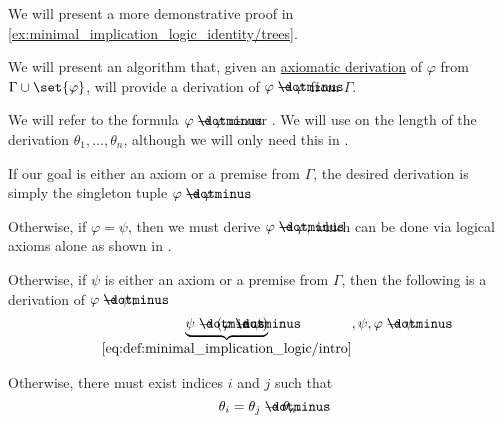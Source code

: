 \begin{comments}
  \item We will present a more demonstrative proof in \eqref{ex:minimal_implication_logic_identity/trees}.
\end{comments}

\begin{algorithm}\label{alg:derivation_conclusion_hypothesis_introduction}
  We will present an algorithm that, given an \hyperref[def:axiomatic_derivation]{axiomatic derivation} of \( \varphi \) from \( \Gamma \cup \set{ \varphi } \), will provide a derivation of \( \varphi \synimplies \varphi \) from \( \Gamma \).

  We will refer to the formula \( \varphi \synimplies \varphi \) as our . We will use  on the length of the derivation \( \theta_1, \ldots, \theta_n \), although we will only need this in .

  \begin{thmenum}
     If our goal is either an axiom or a premise from \( \Gamma \), the desired derivation is simply the singleton tuple \( \varphi \synimplies \varphi \).

     Otherwise, if \( \varphi = \psi \), then we must derive \( \varphi \synimplies \varphi \), which can be done via logical axioms alone as shown in .

     Otherwise, if \( \psi \) is either an axiom or a premise from \( \Gamma \), then the following is a derivation of \( \varphi \synimplies \psi \):
    \begin{equation*}
      \underbrace{\psi \synimplies (\varphi \synimplies \psi)}_{\eqref{eq:def:minimal_implication_logic/intro}},
      \psi,
      \varphi \synimplies \psi.
    \end{equation*}

     Otherwise, there must exist indices \( i \) and \( j \) such that
    \begin{equation*}
      \theta_i = \theta_j \synimplies \theta_n.
    \end{equation*}


\end{thmenum}
\end{algorithm}
